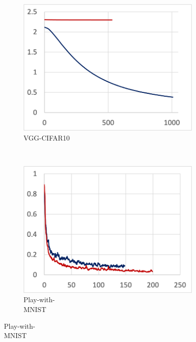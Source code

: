 \begin{figure}[!ht]
\begin{subfigure}[t]{.22\textwidth}
    \includegraphics[width=\textwidth]{keras-cifar}
    \caption{\footnotesize VGG-CIFAR10}
  \end{subfigure}
  ~
  \begin{subfigure}[t]{.22\textwidth}
    \includegraphics[width=\textwidth]{tf2-03}
    \caption{\footnotesize Play-with-\\MNIST}
  \end{subfigure}

  \par\bigskip
  

\end{figure}
